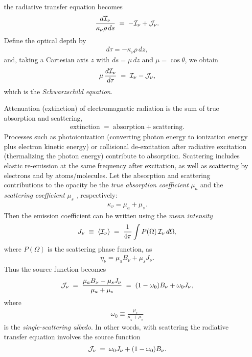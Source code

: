 the radiative transfer equation becomes
\begin{align}
\label{eq:radtran}
\frac{d {\mathcal{I}_\nu}}{\kappa_\nu \rho \, ds} \;=\; - {\mathcal{I}_\nu} + {\mathcal{J}_\nu} .
\end{align}
Define the optical depth by
\begin{align}
d\tau = - \kappa_\nu \rho \, dz ,
\label{eq:opticalddef}
\end{align}
and, taking a Cartesian axis $z$ with $ds=\mu\,dz$ and $\mu=\cos\theta$, we obtain
\begin{align}
\label{eq:radtrantau}
\mu \, \frac{d {\mathcal{I}_\nu}}{d\tau} \;=\; {\mathcal{I}_\nu} - {\mathcal{J}_\nu} ,
\end{align}
which is the \emph{Schwarzschild equation}.

Attenuation (extinction) of electromagnetic radiation is the sum of true absorption and scattering,
\begin{align}
\mathrm{extinction} \;=\; \mathrm{absorption} + \mathrm{scattering} .
\label{eq:extsa}
\end{align}
Processes such as photoionization (converting photon energy to ionization energy plus electron kinetic energy) or collisional de-excitation after radiative excitation (thermalizing the photon energy) contribute to absorption. Scattering includes elastic re-emission at the same frequency after excitation, as well as scattering by electrons and by atoms/molecules. Let the absorption and scattering contributions to the opacity be the \emph{true absorption coefficient} $\mu_a$  and the \emph{scattering coefficient} $\mu_s$ , respectively:
\begin{align}
\kappa_\nu = \mu_a + \mu_s .
\label{eq:extsaa}
\end{align}
Then the emission coefficient can be written using the \emph{mean intensity}
\begin{align}
J_\nu \;\equiv\; \langle {\mathcal{I}_\nu} \rangle \;=\; \frac{1}{4\pi} \int P(\Omega) \, {\mathcal{I}_\nu} \, d\Omega ,
\end{align}
where $P(\Omega)$ is the scattering phase function, as
\begin{align}
\eta_\nu = \mu_a B_\nu + \mu_s J_\nu .
\label{eq:emisaa}
\end{align}
Thus the source function becomes
\begin{align}
{\mathcal{J}_\nu} \;=\; \frac{\mu_a B_\nu + \mu_s J_\nu}{\mu_a + \mu_s}
          \;=\; (1-\omega_0) B_\nu + \omega_0 J_\nu ,
\label{eq:sourcef}
\end{align}
where
\begin{align}
\omega_0 \equiv \frac{\mu_s}{\mu_a+\mu_s}
\label{eq:sia}
\end{align}
is the \emph{single-scattering albedo}. In other words, with scattering the radiative transfer equation involves the source function
\begin{align}
\label{eq:rtscat}
{\mathcal{J}_\nu} \;=\; \omega_0 J_\nu + (1-\omega_0) B_\nu .
\end{align}


